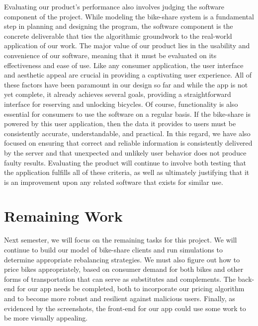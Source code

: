 \documentclass{sig-alternate}
\begin{document}
        	Evaluating our product's performance also involves judging the software component of the project. While modeling the bike-share system is a fundamental step in planning and designing the program, the software component is the concrete deliverable that ties the algorithmic groundwork to the real-world application of our work. The major value of our product lies in the usability and convenience of our software, meaning that it must be evaluated on its effectiveness and ease of use. Like any consumer application, the user interface and aesthetic appeal are crucial in providing a captivating user experience. All of these factors have been paramount in our design so far and while the app is not yet complete, it already achieves several goals, providing a straightforward interface for reserving and unlocking bicycles. Of course, functionality is also essential for consumers to use the software on a regular basis. If the bike-share is powered by this user application, then the data it provides to users must be consistently accurate, understandable, and practical. In this regard, we have also focused on ensuring that correct and reliable information is consistently delivered by the server and that unexpected and unlikely user behavior does not produce faulty results. Evaluating the product will continue to involve both testing that the application fulfills all of these criteria, as well as ultimately justifying that it is an improvement upon any related software that exists for similar use.
\section{Remaining Work}
Next semester, we will focus on the remaining tasks for this project.  We will continue to build our model of bike-share clients and run simulations to determine appropriate rebalancing strategies.  We must also figure out how to price bikes appropriately, based on consumer demand for both bikes and other forms of transportation that can serve as substitutes and complements.  The back-end for our app needs be completed, both to incorporate our pricing algorithm and to become more robust and resilient against malicious users.  Finally, as evidenced by the screenshots, the front-end for our app could use some work to be more visually appealing. \newline
\end{document}
